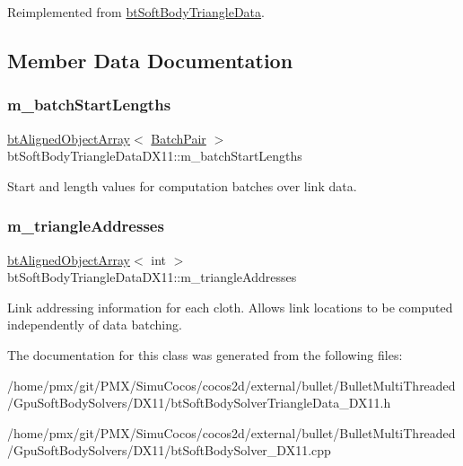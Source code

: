 Reimplemented from \hyperlink{classbtSoftBodyTriangleData}{bt\+Soft\+Body\+Triangle\+Data}.



\subsection{Member Data Documentation}
\mbox{\label{classbtSoftBodyTriangleDataDX11_a656296170e5674fd89683db8c5b0948f}} 
\subsubsection{\texorpdfstring{m\+\_\+batch\+Start\+Lengths}{m\_batchStartLengths}}
{\footnotesize\ttfamily \hyperlink{classbtAlignedObjectArray}{bt\+Aligned\+Object\+Array}$<$ \hyperlink{structbtSoftBodyTriangleDataDX11_1_1BatchPair}{Batch\+Pair} $>$ bt\+Soft\+Body\+Triangle\+Data\+D\+X11\+::m\+\_\+batch\+Start\+Lengths}

Start and length values for computation batches over link data. \mbox{\label{classbtSoftBodyTriangleDataDX11_a265feb3aa3cd4133ae22e94232213420}} 
\subsubsection{\texorpdfstring{m\+\_\+triangle\+Addresses}{m\_triangleAddresses}}
{\footnotesize\ttfamily \hyperlink{classbtAlignedObjectArray}{bt\+Aligned\+Object\+Array}$<$ int $>$ bt\+Soft\+Body\+Triangle\+Data\+D\+X11\+::m\+\_\+triangle\+Addresses}

Link addressing information for each cloth. Allows link locations to be computed independently of data batching. 

The documentation for this class was generated from the following files\+:\begin{DoxyCompactItemize}
\item 
/home/pmx/git/\+P\+M\+X/\+Simu\+Cocos/cocos2d/external/bullet/\+Bullet\+Multi\+Threaded/\+Gpu\+Soft\+Body\+Solvers/\+D\+X11/bt\+Soft\+Body\+Solver\+Triangle\+Data\+\_\+\+D\+X11.\+h\item 
/home/pmx/git/\+P\+M\+X/\+Simu\+Cocos/cocos2d/external/bullet/\+Bullet\+Multi\+Threaded/\+Gpu\+Soft\+Body\+Solvers/\+D\+X11/bt\+Soft\+Body\+Solver\+\_\+\+D\+X11.\+cpp\end{DoxyCompactItemize}
